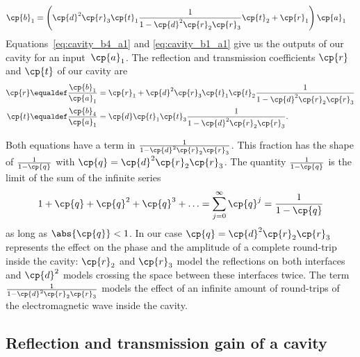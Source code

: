 \begin{refsection}
\begin{align}
    \cp{b}_1
    &=
    \left(
        \cp{d}^2 \cp{r}_3 \cp{t}_1
        \frac{1}{1 - \cp{d}^2 \cp{r}_2 \cp{r}_3} \cp{t}_2 + \cp{r}_1
    \right)
    \cp{a}_1
    \label{eq:cavity_b1_a1}
\end{align}
Equations~\eqref{eq:cavity_b4_a1} and \eqref{eq:cavity_b1_a1} give us the outputs of our cavity for an input~$\cp{a}_1$.
The reflection and transmission coefficients $\cp{r}$ and $\cp{t}$ of our cavity are
\begin{subequations}
\begin{align}
    \cp{r} &\equaldef
    \frac{\cp{b}_1}{\cp{a}_1}
    =
    \cp{r}_1 + \cp{d}^2 \cp{r}_3 \cp{t}_1 \cp{t}_2
    \frac{1}{1 - \cp{d}^2 \cp{r}_2 \cp{r}_3}
    \label{eq:cavity_reflection_coefficient}
    \\
    \cp{t} &\equaldef
    \frac{\cp{b}_4}{\cp{a}_1}
    =
    \cp{d} \cp{t}_1 \cp{t}_3
    \frac{1}{1 - \cp{d}^2 \cp{r}_2 \cp{r}_3}
    \text{.}
    \label{eq:cavity_transmission_coefficient}
\end{align}
\end{subequations}

Both equations have a term in $\frac{1}{1 - \cp{d}^2 \cp{r}_2 \cp{r}_3}$.
This fraction has the shape of $\frac{1}{1 - \cp{q}}$
with $\cp{q}=\cp{d}^2 \cp{r}_2 \cp{r}_3$.
The quantity $\frac{1}{1 - \cp{q}}$ is the limit of the sum of the infinite series
\begin{equation}
    1 + \cp{q} + \cp{q}^2 + \cp{q}^3 + \ldots
    =
    \sum_{j=0}^\infty \cp{q}^j
    =
    \frac{1}{1-\cp{q}}
    \label{eq:infinite_series}
\end{equation}
as long as $\abs{\cp{q}} < 1$.
In our case $\cp{q}=\cp{d}^2 \cp{r}_2 \cp{r}_3$ represents the effect on the phase and the amplitude of a complete round-trip inside the cavity: $\cp{r}_2$ and $\cp{r}_3$ model the reflections on both interfaces and $\cp{d}^2$ models crossing the space between these interfaces twice.
The term $\frac{1}{1 - \cp{d}^2 \cp{r}_2 \cp{r}_3}$ models the effect of an infinite amount of round-trips of the electromagnetic wave inside the cavity.






\subsection{Reflection and transmission gain of a cavity}


\end{refsection}
